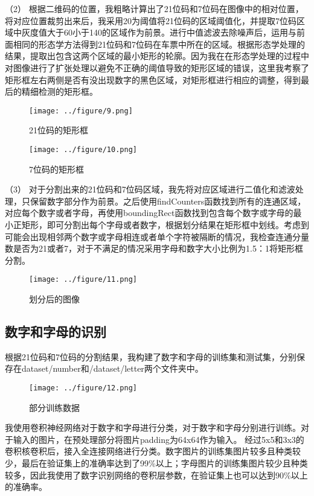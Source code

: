 \documentclass[11pt]{ctexart}
\begin{document}
	（2） 根据二维码的位置，我粗略计算出了21位码和7位码在图像中的相对位置，将对应位置裁剪出来后，我采用20为阈值将21位码的区域阈值化，并提取7位码区域中灰度值大于60小于140的区域作为前景。进行中值滤波去除噪声后，运用与前面相同的形态学方法得到21位码和7位码在车票中所在的区域。根据形态学处理的结果，提取出包含这两个区域的最小矩形的轮廓。因为我在在形态学处理的过程中对图像进行了扩张处理以避免不正确的阈值导致的矩形区域的错误，这里我考察了矩形框左右两侧是否有没出现数字的黑色区域，对矩形框进行相应的调整，得到最后的精细检测的矩形框。
	
	\begin{figure}[h]
		\begin{minipage}[H]{0.5\linewidth}
			\centering
			\texttt{[image: ../figure/9.png]}
			\caption{21位码的矩形框}
		\end{minipage}%
		\begin{minipage}[H]{0.5\linewidth}
			\centering
			\texttt{[image: ../figure/10.png]}
			\caption{7位码的矩形框}
		\end{minipage}
	\end{figure}
	
	（3） 对于分割出来的21位码和7位码区域，我先将对应区域进行二值化和滤波处理，只保留数字部分作为前景。之后使用findCounters函数找到所有的连通区域，对应每个数字或者字母，再使用boundingRect函数找到包含每个数字或字母的最小正矩形，即可分割出每个字母或者数字，根据划分结果在矩形框中划线。考虑到可能会出现相邻两个数字或字母相连或者单个字符被隔断的情况，我检查连通分量数是否为21或者7，对于不满足的情况采用字母和数字大小比例为1.5：1将矩形框分割。
	
	\begin{figure}[h]
		\centering
		\texttt{[image: ../figure/11.png]}
		\caption{划分后的图像}
	\end{figure}
	
	\subsection{数字和字母的识别}
	
	根据21位码和7位码的分割结果，我构建了数字和字母的训练集和测试集，分别保存在dataset/number和/dataset/letter两个文件夹中。
	
	\begin{figure}[h]
		\centering
		\texttt{[image: ../figure/12.png]}
		\caption{部分训练数据}
	\end{figure}

	我使用卷积神经网络对于数字和字母进行分类，对于数字和字母分别进行训练。对于输入的图片，在预处理部分将图片padding为64x64作为输入。
	经过5x5和3x3的卷积核卷积后，接入全连接网络进行分类。数字图片的训练集图片较多且种类较少，最后在验证集上的准确率达到了99\%以上；字母图片的训练集图片较少且种类较多，因此我使用了数字识别网络的卷积层参数，在验证集上也可以达到90\%以上的准确率。
	
\end{document}
